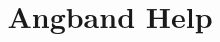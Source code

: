 \documentclass[a4paper]{article}
\begin{document}
\title{Angband Help}
\maketitle
\tableofcontents











\printindex
\end{document}
